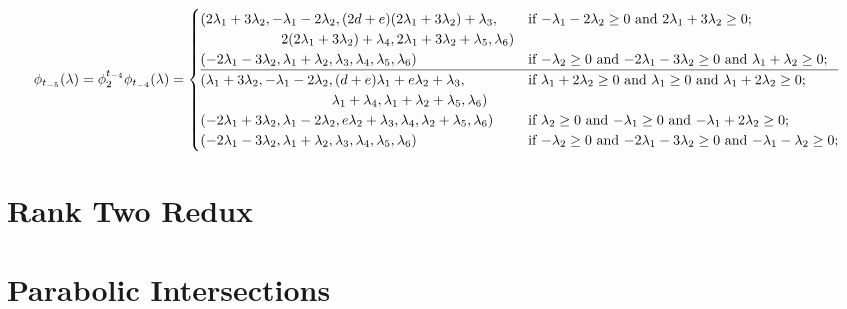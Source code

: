 \documentclass{amsart}
\numberwithin{theorem}{section}
\begin{document}
  \[
    \phi_{t_{-5}}(\lambda)=\phi^{t_{-4}}_2\phi_{t_{-4}}(\lambda)
    =
    \begin{cases}
      (2\lambda_1+3\lambda_2,-\lambda_1-2\lambda_2,(2d+e)(2\lambda_1+3\lambda_2)+\lambda_3, & \text{if $-\lambda_1-2\lambda_2 \ge 0$ and $2\lambda_1+3\lambda_2 \ge 0$;}\\
      \hspace{0.8in} 2(2\lambda_1+3\lambda_2)+\lambda_4,2\lambda_1+3\lambda_2+\lambda_5,\lambda_6) & \\
      (-2\lambda_1-3\lambda_2,\lambda_1+\lambda_2,\lambda_3,\lambda_4,\lambda_5,\lambda_6) & \text{if $-\lambda_2 \ge 0$ and $-2\lambda_1-3\lambda_2 \ge 0$ and $\lambda_1+\lambda_2 \ge 0$;}\\
    \hline
      (\lambda_1+3\lambda_2,-\lambda_1-2\lambda_2,(d+e)\lambda_1+e\lambda_2+\lambda_3, & \text{if $\lambda_1+2\lambda_2 \ge 0$ and $\lambda_1 \ge 0$ and $\lambda_1+2\lambda_2 \ge 0$;}\\
      \hspace{1.3in} \lambda_1+\lambda_4,\lambda_1+\lambda_2+\lambda_5,\lambda_6) & \\
      (-2\lambda_1+3\lambda_2,\lambda_1-2\lambda_2,e\lambda_2+\lambda_3,\lambda_4,\lambda_2+\lambda_5,\lambda_6) & \text{if $\lambda_2 \ge 0$ and $-\lambda_1 \ge 0$ and $-\lambda_1+2\lambda_2 \ge 0$;}\\
      (-2\lambda_1-3\lambda_2,\lambda_1+\lambda_2,\lambda_3,\lambda_4,\lambda_5,\lambda_6) & \text{if $-\lambda_2 \ge 0$ and $-2\lambda_1-3\lambda_2 \ge 0$ and $-\lambda_1-\lambda_2 \ge 0$;}\\
    \end{cases}
  \]


\section{Rank Two Redux}
  

\section{Parabolic Intersections}
\end{document}
